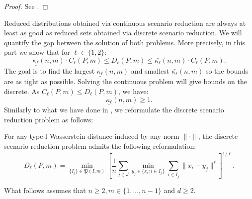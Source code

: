 \documentclass{amsart}
\begin{document}
\begin{proof}
    See \cite[Theorem 2 and 3]{rujeerapaiboon_scenario_2022}.
\end{proof}
Reduced distributions obtained via continuous scenario reduction are always at least as good as reduced sets obtained via discrete scenario reduction. We will quantify the gap between the solution of both problems. More precisely, in this part we show that for $\ell\in\{1,2\}$: 
$$\underline{\kappa_\ell}\left(n,m\right)\cdot C_\ell\left(P,m\right)\leq D_\ell\left(P,m\right)\leq \bar{\kappa_\ell}\left(n,m\right)\cdot C_\ell\left(P,m\right).$$
The goal is to find the largest $\underline{\kappa_\ell}\left(n,m\right)$ and smallest $\bar{\kappa_\ell}\left(n,m\right)$ so the bounds are as tight as possible. Solving the continuous problem will give bounds on the discrete. As $C_\ell\left(P,m\right)\leq D_\ell\left(P,m\right)$, we have:
$$
\underline{\kappa_\ell}\left(n,m\right)\geq1.
$$
Similarly to what we have done in , we reformulate the discrete scenario reduction problem as follows:
\begin{theorem}\label{reformulation 2}
    For any type-l Wasserstein distance induced by any norm $\lVert\cdot\rVert$, the discrete scenario reduction problem admits the following reformulation: 
    $$
    D_\ell\left(P,m\right)=\min_{\{I_j\}\in\mathfrak{P}\left(I,m\right)}\left[ \frac{1}{n}\sum_{j\in J}\min_{y_j\in\{x_i : i\in I_j\}}\sum_{i\in I_j}\lVert x_i-y_j\rVert^\ell\right]^{1/\ell}.
    $$
\end{theorem}

\noindent What follows assumes that $n\geq2, m\in\{1,...,n-1\}$ and $d\geq2.$ \\
\end{document}
